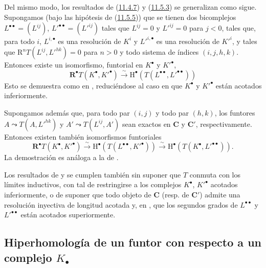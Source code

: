 \begin{env}[11.5.6]
\label{0.11.5.6-fr}
Del mismo modo, los resultados de (\hyperref[0.11.4.7-fr]{11.4.7}) y (\hyperref[0.11.5.3-fr]{11.5.3}) se generalizan como sigue. Supongamos (bajo las hipótesis de (\hyperref[0.11.5.5-fr]{11.5.5})) que se tienen dos bicomplejos $L^{\bullet\bullet}=(L^{ij})$, $L'^{\bullet\bullet}=(L'^{ij})$ tales que $L^{ij}=0$ y $L'^{ij}=0$ para $j<0$, tales que, para todo $i$, $L^{i,\bullet}$ es una resolución de $K^i$ y $L'^{i,\bullet}$ es una resolución de $K'^i$, y tales que
$\mathrm R^nT(L^{ij},L'^{hk})=0$
para $n>0$ y todo sistema de índices $(i,j,h,k)$.
Entonces existe un isomorfismo, funtorial en $K^\bullet$ y $K'^\bullet$,
\[
  \label{0.11.5.6.1-fr}
  \mathbf R^\bullet T(K^\bullet,K'^\bullet)\xrightarrow{\sim}
  \mathrm H^\bullet(T(L^{\bullet\bullet},L'^{\bullet\bullet}))
  \tag{11.5.6.1}
\]
Esto se demuestra como en , reduciéndose al caso en que $K^\bullet$ y $K'^\bullet$ están acotados inferiormente.

Supongamos además que, para todo par $(i,j)$ y todo par $(h,k)$, los funtores $A\leadsto T(A,L'^{hk})$ y $A'\leadsto T(L^{ij},A')$ sean exactos en $\boldsymbol{C}$ y $\boldsymbol{C}'$, respectivamente.
Entonces existen también isomorfismos funtoriales
\[
  \label{0.11.5.6.2-fr}
  \mathbf R^\bullet T(K^\bullet,K'^\bullet)
  \xrightarrow{\sim}\mathrm H^\bullet(T(L^{\bullet\bullet},K'^\bullet))
  \xrightarrow{\sim}\mathrm H^\bullet(T(K^\bullet,L'^{\bullet\bullet})).
  \tag{11.5.6.2}
\]
La demostración es análoga a la de .
\end{env}

\begin{env}[11.5.7]
\label{0.11.5.7}
\label{0.11.5.7-fr}
Los resultados de  y  se cumplen también sin suponer que $T$ conmuta con los límites inductivos, con tal de restringirse a los complejos $K^\bullet$, $K'^\bullet$ acotados inferiormente, o de suponer que todo objeto de $\boldsymbol{C}$ (resp. de $\boldsymbol{C}'$) admite una resolución inyectiva de longitud acotada y, en , que los segundos grados de $L^{\bullet\bullet}$ y $L'^{\bullet\bullet}$ están acotados superiormente.
\end{env}

\subsection{Hiperhomología de un funtor con respecto a un complejo $K_\bullet$}
\label{subsection:0.11.6}
\label{subsection:0.11.6-fr}

